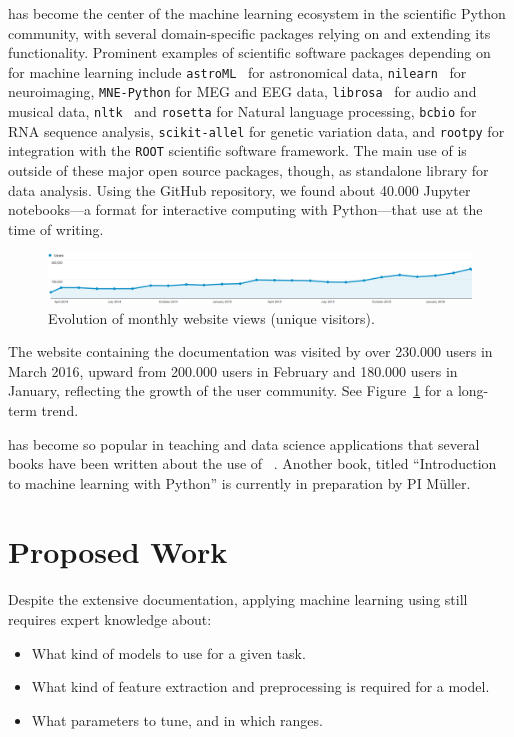 \sklearn{} has become the center of the machine learning ecosystem in the scientific Python community,
with several domain-specific packages relying on and extending its functionality.
Prominent examples of scientific software packages depending on \sklearn{}
for machine learning include \texttt{astroML}~\autocite{van2013openml} for astronomical
data, \texttt{nilearn}~\autocite{abraham2014machine} for neuroimaging, \texttt{MNE-Python} for MEG
and EEG data, \texttt{librosa}~\autocite{mcfee2015librosa} for audio and musical data,
\texttt{nltk}~\autocite{bird2006nltk} and \texttt{rosetta} for Natural language processing, \texttt{bcbio} for
RNA sequence analysis, \texttt{scikit-allel} for genetic variation data, and \texttt{rootpy} for
integration with the \texttt{ROOT} scientific software framework.
The main use of \sklearn{} is outside of these major open source packages, though,
as standalone library for data analysis. Using the GitHub repository, we found
about 40.000 Jupyter notebooks---a format for interactive computing with
Python---that use \sklearn{} at the time of writing.

\begin{figure}
    \begin{center}
    \includegraphics[width=.95\linewidth]{scikit-learn_site_visits}
    \end{center}
    \caption{Evolution of monthly \sklearn{}  website views (unique visitors).}
    \label{traffic}
\end{figure}

The \sklearn{} website containing the documentation was visited by over
230.000 users in March 2016, upward from 200.000 users in February and 180.000
users in January, reflecting the growth of the \sklearn{} user community. See
Figure~\ref{traffic} for a long-term trend.

\sklearn{} has become so popular in teaching and data science applications that
several books have been written about the use of
\sklearn{}~\autocite{garreta2013learning, hackeling2014mastering,
hauck2014scikit, raschka2015python}. Another book, titled ``Introduction to
machine learning with Python'' is currently in preparation by PI M\"uller.

\section{Proposed Work}
Despite the extensive documentation, applying machine learning using \sklearn{}
still requires expert knowledge about:
\begin{itemize}
    \item What kind of models to use for a given task.
    \item What kind of feature extraction and preprocessing is required for a model.
    \item What parameters to tune, and in which ranges.
\end{itemize}


